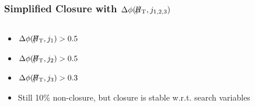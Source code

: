 \documentclass{beamer}
\begin{document}
\begin{frame}
 \frametitle{Simplified Closure with $\Delta\phi(\MHT,j_{1,2,3})$}
 \begin{columns}
  \begin{column}{0.33\textwidth}
  \begin{itemize}
   \item $\Delta\phi(\MHT,j_{1})>0.5$
   \item $\Delta\phi(\MHT,j_{2})>0.5$
   \item $\Delta\phi(\MHT,j_{3})>0.3$
   \item Still 10\% non-closure, but closure is stable w.r.t. search variables
  \end{itemize}
  \end{column}
  \begin{column}{0.33\textwidth}
   \begin{tikzpicture}

\end{tikzpicture}
\end{column}
\end{columns}
\end{frame}
\end{document}
